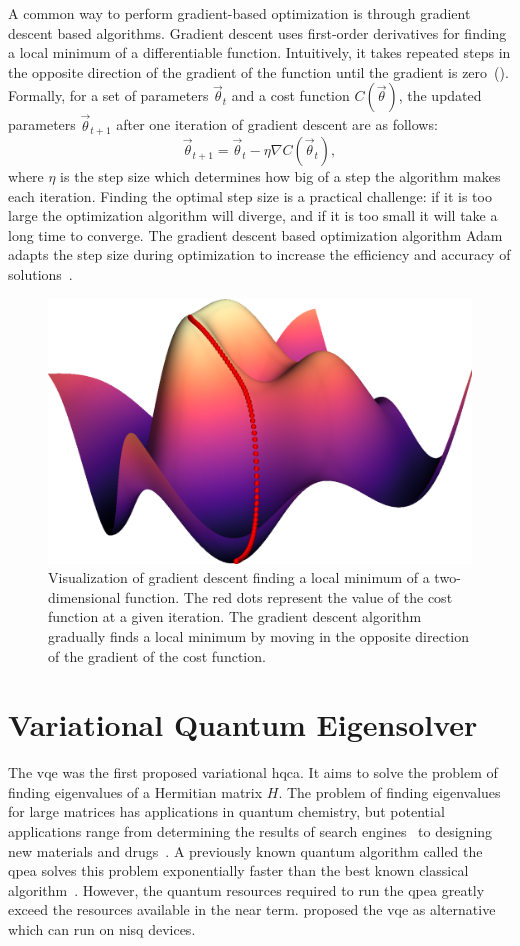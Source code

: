 A common way to perform gradient-based optimization is through gradient descent based algorithms.
Gradient descent uses first-order derivatives for finding a local minimum of a differentiable function.
Intuitively, it takes repeated steps in the opposite direction of the gradient of the function until the gradient is zero~().
Formally, for a set of parameters $\vec{\theta}_t$ and a cost function $C(\vec{\theta})$, the updated parameters $\vec{\theta}_{t+1}$ after one iteration of gradient descent are as follows:
\begin{equation}
\vec{\theta}_{t+1} = \vec{\theta}_t - \eta\nabla C(\vec{\theta}_t),
\end{equation}
where $\eta$ is the step size which determines how big of a step the algorithm makes each iteration.
Finding the optimal step size is a practical challenge: if it is too large the optimization algorithm will diverge, and if it is too small it will take a long time to converge.
The gradient descent based optimization algorithm Adam adapts the step size during optimization to increase the efficiency and accuracy of solutions~\cite{kingma2014adam}.

\begin{figure}[ht]
    \centering
    \includegraphics[width=0.45\linewidth]{figures/gradient_descent.png}
    \caption[Visualization of gradient descent finding a local minimum of a function.]{Visualization of gradient descent finding a local minimum of a two-dimensional function. The red dots represent the value of the cost function at a given iteration. The gradient descent algorithm gradually finds a local minimum by moving in the opposite direction of the gradient of the cost function.}
    \label{fig:gradient_descent}
\end{figure}

\section{Variational Quantum Eigensolver}
The \gls{vqe} was the first proposed variational \gls{hqca}.
It aims to solve the problem of finding eigenvalues of a Hermitian matrix $H$.
The problem of finding eigenvalues for large matrices has applications in quantum chemistry, but potential applications range from determining the results of search engines~\cite{page1999pagerank} to designing new materials and drugs~\cite{golub2000eigenvalue}.
A previously known quantum algorithm called the \gls{qpea} solves this problem exponentially faster than the best known classical algorithm~\cite{abrams1999quantum}.
However, the quantum resources required to run the \gls{qpea} greatly exceed the resources available in the near term.
\textcite{peruzzo2014variational} proposed the \gls{vqe} as alternative which can run on \gls{nisq} devices.

